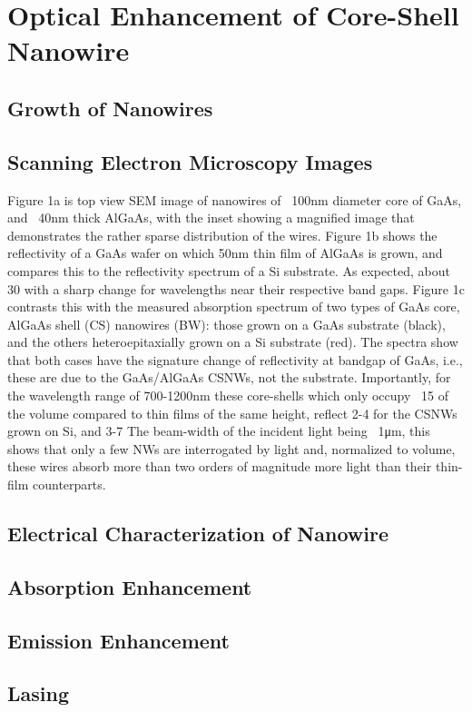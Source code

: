 \chapter{Optical Enhancement of Core-Shell Nanowire} \label{data}


\section{Growth of Nanowires}



\section{Scanning Electron Microscopy Images} 

Figure 1a is top view SEM image of nanowires of ~100nm diameter core of GaAs,
and ~40nm thick AlGaAs, with the inset showing a magnified image that
demonstrates the rather sparse distribution of the wires. Figure 1b shows the
reflectivity of a GaAs wafer on which 50nm thin film of AlGaAs is grown, and
compares this to the reflectivity spectrum of a Si substrate. As expected,
about 30%
with a sharp change for wavelengths near their respective band gaps. Figure 1c
contrasts this with the measured absorption spectrum of two types of GaAs core,
AlGaAs shell (CS) nanowires (BW): those grown on a GaAs substrate (black), and
the others heteroepitaxially grown on a Si substrate (red). The spectra show
that both cases have the signature change of reflectivity at bandgap of GaAs,
i.e., these are due to the GaAs/AlGaAs CSNWs, not the substrate. Importantly,
for the wavelength range of 700-1200nm these core-shells which only occupy ~15%
of the volume compared to thin films of the same height, reflect 2-4%
for the CSNWs grown on Si, and 3-7%
The beam-width of the incident light being ~1μm, this shows that only a few NWs
are interrogated by light and, normalized to volume, these wires absorb more
than two orders of magnitude more light than their thin-film counterparts.

\section{Electrical Characterization of Nanowire}

\section{Absorption Enhancement} \label{X-ray}


\section{Emission Enhancement} \label{Dust_data}


\section{Lasing} \label{BH_data}

